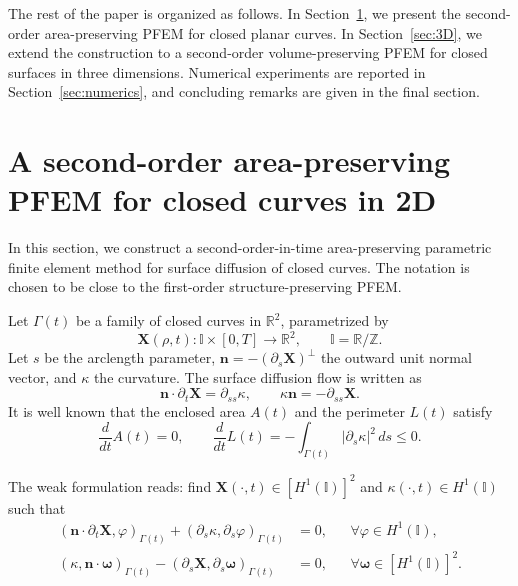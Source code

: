 \documentclass[smallextended]{svjour3}
\numberwithin{equation}{section}
\begin{document}
	The rest of the paper is organized as follows. In Section~\ref{sec:2D}, we present the second-order area-preserving PFEM for closed planar curves. In Section~\ref{sec:3D}, we extend the construction to a second-order volume-preserving PFEM for closed surfaces in three dimensions. Numerical experiments are reported in Section~\ref{sec:numerics}, and concluding remarks are given in the final section.
	
	\section{A second-order area-preserving PFEM for closed curves in 2D}
	\label{sec:2D}
	
	In this section, we construct a second-order-in-time area-preserving parametric finite element method for surface diffusion of closed curves. The notation is chosen to be close to the first-order structure-preserving PFEM.
	
	Let $\Gamma(t)$ be a family of closed curves in $\mathbb{R}^2$, parametrized by
	\[
	\mathbf{X}(\rho,t):\mathbb{I}\times[0,T]\to\mathbb{R}^2,\qquad 
	\mathbb{I}=\mathbb{R}/\mathbb{Z}.
	\]
	Let $s$ be the arclength parameter, $\mathbf{n}=-(\partial_s\mathbf{X})^\perp$ the outward unit normal vector, and $\kappa$ the curvature. The surface diffusion flow is written as
	\begin{equation}
		\mathbf{n}\cdot\partial_t\mathbf{X}=\partial_{ss}\kappa,
		\qquad
		\kappa\mathbf{n}=-\partial_{ss}\mathbf{X}.
		\label{eq:strong-2d}
	\end{equation}
	It is well known that the enclosed area $A(t)$ and the perimeter $L(t)$ satisfy
	\begin{equation}
		\frac{d}{dt}A(t)=0,\qquad
		\frac{d}{dt}L(t)=-\int_{\Gamma(t)}|\partial_s\kappa|^2\,ds\le 0.
	\end{equation}
	
	The weak formulation reads: find $\mathbf{X}(\cdot,t)\in[H^1(\mathbb{I})]^2$ and $\kappa(\cdot,t)\in H^1(\mathbb{I})$ such that
	\begin{subequations}
		\begin{align}
			\left(\mathbf{n}\cdot\partial_t\mathbf{X},\varphi\right)_{\Gamma(t)}
			+\left(\partial_s\kappa,\partial_s\varphi\right)_{\Gamma(t)}
			&=0,
			&&\forall \varphi\in H^1(\mathbb{I}),
			\label{eq:weak-2d-a}
			\\
			\left(\kappa,\mathbf{n}\cdot\boldsymbol{\omega}\right)_{\Gamma(t)}
			-\left(\partial_s\mathbf{X},\partial_s\boldsymbol{\omega}\right)_{\Gamma(t)}
			&=0,
			&&\forall \boldsymbol{\omega}\in[H^1(\mathbb{I})]^2.
			\label{eq:weak-2d-b}
		\end{align}
	\end{subequations}
	
\end{document}
